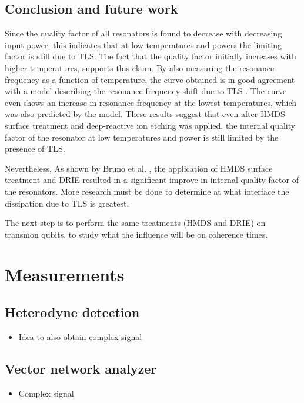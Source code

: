 \documentclass[12pt]{report}
\begin{document}
\section{Conclusion and future work}

Since the quality factor of all resonators is found to decrease with decreasing input power, this indicates that at low temperatures and powers the limiting factor is still due to TLS. The fact that the quality factor initially increases with higher temperatures, supports this claim. By also measuring  the resonance frequency as a function of temperature, the curve obtained is in good agreement with a model describing the resonance frequency shift due to TLS \cite{gao2008experimental}. The curve even shows an increase in resonance frequency at the lowest temperatures, which was also predicted by the model. These results suggest that even after HMDS surface treatment and deep-reactive ion etching was applied, the internal quality factor of the resonator at low temperatures and power is still limited by the presence of TLS.

Nevertheless, As shown by Bruno et al. \cite{DRIE}, the application of HMDS surface treatment and DRIE resulted in a significant improve in internal quality factor of the resonators. More research must be done to determine at what interface the dissipation due to TLS is greatest.

The next step is to perform the same treatments (HMDS and DRIE) on transmon qubits, to study what the influence will be on coherence times.



\chapter{Measurements}



\section{Heterodyne detection}
\begin{itemize}
    \item Idea to also obtain complex signal
\end{itemize}

\section{Vector network analyzer}
\begin{itemize}
    \item Complex signal
\end{itemize}
\end{document}
